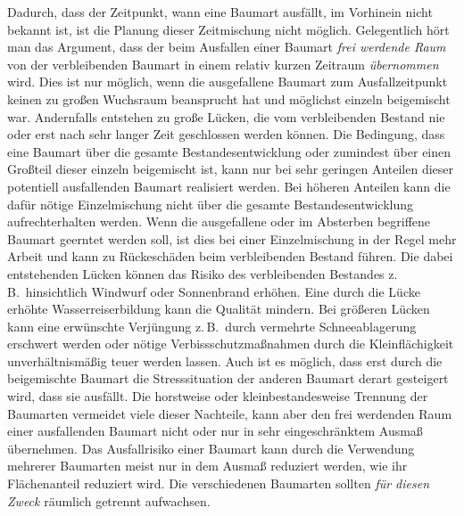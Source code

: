 \documentclass[twocolumn, paper=a4, fontsize=10pt, bibliography=totoc, index=totoc]{scrartcl}
\begin{document}
Dadurch, dass der Zeitpunkt, wann eine Baumart ausfällt, im Vorhinein nicht
bekannt ist, ist die Planung dieser Zeitmischung nicht möglich. Gelegentlich
hört man das Argument, dass der beim Ausfallen einer Baumart \emph{frei
werdende Raum} von der verbleibenden Baumart in einem relativ kurzen Zeitraum
\emph{übernommen} wird. Dies ist nur möglich, wenn die ausgefallene Baumart zum
Ausfallzeitpunkt keinen zu großen Wuchsraum beansprucht hat und möglichst
einzeln beigemischt war. Andernfalls entstehen zu große Lücken, die vom
verbleibenden Bestand nie oder erst nach sehr langer Zeit geschlossen werden
können. Die Bedingung, dass eine Baumart über die gesamte Bestandesentwicklung
oder zumindest über einen Großteil dieser einzeln beigemischt ist, kann nur bei
sehr geringen Anteilen dieser potentiell ausfallenden Baumart realisiert
werden. Bei höheren Anteilen kann die dafür nötige Einzelmischung nicht über
die gesamte Bestandesentwicklung aufrechterhalten werden. Wenn die ausgefallene
oder im Absterben begriffene Baumart geerntet werden soll, ist dies bei einer
Einzelmischung in der Regel mehr Arbeit und kann zu Rückeschäden beim
verbleibenden Bestand führen. Die dabei entstehenden Lücken können das Risiko
des verbleibenden Bestandes z.\,B.\ hinsichtlich Windwurf oder Sonnenbrand
erhöhen. Eine durch die Lücke erhöhte Wasserreiserbildung kann die Qualität
mindern. Bei größeren Lücken kann eine erwünschte Verjüngung z.\,B.\ durch
vermehrte Schneeablagerung erschwert werden oder nötige Verbissschutzmaßnahmen
durch die Kleinflächigkeit unverhältnismäßig teuer werden lassen. Auch ist es
möglich, dass erst durch die beigemischte Baumart die Stresssituation der
anderen Baumart derart gesteigert wird, dass sie ausfällt. Die horstweise oder
kleinbestandesweise Trennung der Baumarten vermeidet viele dieser Nachteile,
kann aber den frei werdenden Raum einer ausfallenden Baumart nicht oder nur
in sehr eingeschränktem Ausmaß übernehmen. Das Ausfallrisiko einer Baumart
kann durch die Verwendung mehrerer Baumarten meist nur in dem Ausmaß reduziert
werden, wie ihr Flächenanteil reduziert wird. Die verschiedenen Baumarten
sollten \emph{für diesen Zweck} räumlich getrennt aufwachsen.
\end{document}
